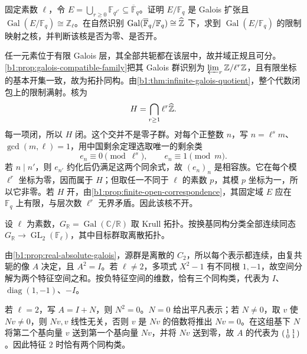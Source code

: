 \begin{exercise}\label{b1:ex:22-12}
	固定素数 \(\ell\)，令 \(E=\bigcup_{r\geq0}\mathbb F_{q^{\ell^r}}\subseteq\overline{\mathbb F}_q\)。证明 \(E/\mathbb F_q\) 是 Galois 扩张且 \(\operatorname{Gal}(E/\mathbb F_q)\cong\mathbb Z_\ell\)。在自然识别 \(\operatorname{Gal}(\overline{\mathbb F}_q/\mathbb F_q)\cong\widehat{\vphantom{Z}\mathbb Z}\) 下，求到 \(\operatorname{Gal}(E/\mathbb F_q)\) 的限制映射之核，并判断该核是否为零、是否开。
\end{exercise}
\begin{solution}
	任一元素位于有限 Galois 层，其全部共轭都在该层中，故并域正规且可分。\cref{b1:prop:galois-compatible-family}把其 Galois 群识别为 \(\varprojlim_r\mathbb Z/\ell^r\mathbb Z\)，且有限坐标的基本开集一致，故为拓扑同构。由\cref{b1:thm:infinite-galois-quotient}，整个代数闭包上的限制满射。核为
	\[
		H=\bigcap_{r\geq1}\ell^r\widehat{\vphantom{Z}\mathbb Z}.
	\]
	每一项闭，所以 \(H\) 闭。这个交并不是零子群。对每个正整数 \(n\)，写 \(n=\ell^s m\)、\(\gcd(m,\ell)=1\)，用中国剩余定理选取唯一的剩余类
	\[
		e_n\equiv0\pmod{\ell^s},\qquad e_n\equiv1\pmod m.
	\]
	若 \(n\mid n'\)，则 \(e_{n'}\) 约化后仍满足这两个同余式，故 \((e_n)_n\) 是相容族。它在每个模 \(\ell^r\) 坐标为零，因而属于 \(H\)；但取任一不同于 \(\ell\) 的素数 \(p\)，其模 \(p\) 坐标为一，所以它非零。若 \(H\) 开，由\cref{b1:prop:finite-open-correspondence}，其固定域 \(E\) 应在 \(\mathbb F_q\) 上有限，与层次数 \(\ell^r\) 无界矛盾。因此该核不开。
\end{solution}

\begin{exercise}\label{b1:ex:22-13}
	设 \(\ell\) 为素数，\(G_{\mathbb R}=\operatorname{Gal}(\mathbb C/\mathbb R)\) 取 Krull 拓扑。按换基同构分类全部连续同态 \(G_{\mathbb R}\to\operatorname{GL}_2(\mathbb F_\ell)\)，其中目标群取离散拓扑。
\end{exercise}
\begin{solution}
	由\cref{b1:prop:real-absolute-galois}，源群是离散的 \(C_2\)，所以每个表示都连续，由复共轭的像 \(A\) 决定，且 \(A^2=I\)。若 \(\ell\neq2\)，多项式 \(X^2-1\) 有不同根 \(1,-1\)，故空间分解为两个特征空间之和。按负特征空间的维数，恰有三个同构类，代表为 \(I\)、\(\operatorname{diag}(1,-1)\)、\(-I\)。

	若 \(\ell=2\)，写 \(A=I+N\)，则 \(N^2=0\)。\(N=0\) 给出平凡表示；若 \(N\neq0\)，取 \(v\) 使 \(Nv\neq0\)，则 \(Nv,v\) 线性无关，否则 \(v\) 是 \(Nv\) 的倍数将推出 \(Nv=0\)。在这组基下 \(N\) 将第二个基向量 \(v\) 送到第一个基向量 \(Nv\)，并将 \(Nv\) 送到零，故 \(A\) 的代表为 \(\begin{psmallmatrix}1&1\\0&1\end{psmallmatrix}\)。因此特征 \(2\) 时恰有两个同构类。
\end{solution}

